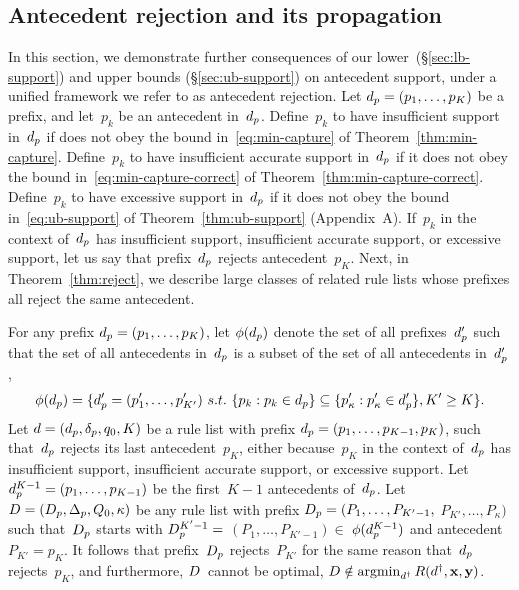 \begin{arxiv}
\subsection{Antecedent rejection and its propagation}
\label{sec:reject}

In this section, we demonstrate further consequences of
our lower~(\S\ref{sec:lb-support}) and upper
bounds (\S\ref{sec:ub-support}) on antecedent support,
under a unified framework we refer to as antecedent rejection.
%
Let ${d_p = (p_1, \dots, p_K)}$ be a prefix,
and let~$p_k$ be an antecedent in~$d_p$.
%
Define~$p_k$ to have insufficient support in~$d_p$
if does not obey the bound in~\eqref{eq:min-capture}
of Theorem~\ref{thm:min-capture}.
%
Define~$p_k$ to have insufficient accurate support in~$d_p$
if it does not obey the bound in~\eqref{eq:min-capture-correct}
of Theorem~\ref{thm:min-capture-correct}.
%
Define~$p_k$ to have excessive support in~$d_p$
if it does not obey the bound in~\eqref{eq:ub-support}
of Theorem~\ref{thm:ub-support} (Appendix~A).
%
If~$p_k$ in the context of~$d_p$ has insufficient support,
insufficient accurate support, or excessive support,
let us say that prefix~$d_p$ rejects antecedent~$p_K$.
%
Next, in Theorem~\ref{thm:reject}, we describe large classes of
related rule lists whose prefixes all reject the same antecedent.

\begin{theorem}
\label{thm:reject}
For any prefix ${d_p = (p_1, \dots, p_K)}$,
let $\phi(d_p)$ denote the set of all
prefixes~$d_p'$ such that
the set of all antecedents in~$d_p$ is a subset of
the set of all antecedents in~$d_p'$, \ie
\begin{align}
\phi(d_p) =
\{d_p' = (p'_1, \dots, p'_{K'})
~s.t.~ \{p_k : p_k \in d_p \} \subseteq
\{p'_\kappa : p'_\kappa \in d_p'\}, K' \ge K \}.
\label{eq:start-contains}
\end{align}
%
Let ${{d} = (d_p, \delta_p, q_0, K)}$ be a rule list
with prefix ${d_p = (p_1, \dots, p_{K-1}, p_{K})}$,
such that~$d_p$ rejects its last antecedent~$p_{K}$,
either because~$p_{K}$ in the context of~$d_p$ has
insufficient support, insufficient accurate support,
or excessive support.
%
Let ${d_p^{K-1} = (p_1, \dots, p_{K-1})}$ be the
first~${K - 1}$ antecedents of~$d_p$.
%
Let ${{D} = (D_p, \Delta_p, Q_0, \kappa)}$
be any rule list with prefix
${D_p = (P_1, \dots, P_{K'-1},}$ ${P_{K'}, \dots, P_{\kappa})}$
such that~$D_p$ starts with ${D_p^{K'-1} =}$
${(P_1, \dots, P_{K'-1}) \in}$ ${\phi(d_p^{K-1})}$
and antecedent ${P_{K'} = p_{K}}$.
%
It follows that prefix~$D_p$ rejects~$P_{K'}$
for the same reason that~$d_p$ rejects~$p_{K}$,
and furthermore, ${D}$~cannot be optimal, \ie
${{D} \notin \operatorname*{argmin}_{{d}^\dagger} R({d}^\dagger, \mathbf{x}, \mathbf{y})}$.
\end{theorem}


\end{arxiv}
